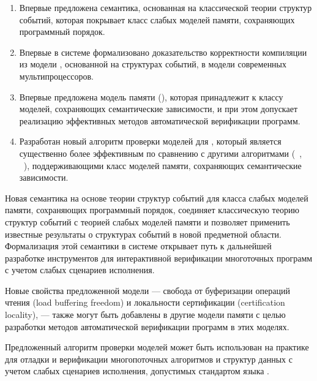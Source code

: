 {\novelty}
\begin{enumerate}[beginpenalty=10000] %

  \item Впервые предложена семантика, основанная на классической теории структур событий,
    которая покрывает класс слабых моделей памяти, сохраняющих программный порядок.

  \item Впервые  в системе \coq формализовано доказательство корректности компиляции
    из модели \Wkm, основанной на структурах событий, 
    в модели современных мультипроцессоров.  

  \item Впервые предложена модель памяти (\WkmS),
    которая принадлежит к классу моделей, сохраняющих семантические зависимости, 
    и при этом допускает реализацию эффективных методов автоматической верификации программ. 

  \item Разработан новый алгоритм проверки моделей для \WkmS,
    который является существенно более эффективным по сравнению с другими алгоритмами
    (\CDSChecker~\autocite{Norris-Demsky:OOPSLA2013}, \rmem~\autocite{Pulte-al:PLDI2019}),
    поддерживающими класс моделей памяти, сохраняющих семантические зависимости.

\end{enumerate}

{\influence} 

Новая семантика на основе теории структур событий 
для класса слабых моделей памяти, сохраняющих программный порядок,
соединяет классическую теорию структур событий 
с теорией слабых моделей памяти и позволяет применить известные результаты 
о структурах событий в новой предметной области.  
Формализация этой семантики в системе \coq открывает 
путь к дальнейшей разработке инструментов для  
интерактивной верификации многоточных программ  
с учетом слабых сценариев исполнения. 
 
Новые свойства предложенной модели \WkmS ---
свобода от буферизации операций чтения (load buffering freedom)
и локальности сертификации (certification locality), --- 
также могут быть добавлены  в другие модели памяти 
с целью разработки методов автоматической верификации программ в этих моделях. 

Предложенный  алгоритм проверки моделей может быть использован на практике
для отладки и верификации многопоточных алгоритмов и структур данных 
с учетом слабых сценариев исполнения, допустимых стандартом языка \CLANG. 

